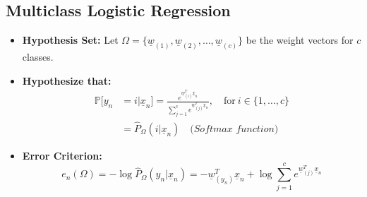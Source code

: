 \subsection{Multiclass Logistic Regression}
\begin{definition}
    \begin{itemize}
        \item \textbf{Hypothesis Set:} Let \( \Omega = \{ \underline{w}_{(1)}, \underline{w}_{(2)}, \dots, \underline{w}_{(c)} \} \) be the weight vectors for \( c \) classes.
        

        \item \textbf{Hypothesize that:}
        \begin{align*}
            \mathbb{P}[y_n &= i | \underline{x}_n] = \frac{e^{\underline{w}_{(i)}^T \underline{x}_n}}{\sum_{j=1}^{c} e^{\underline{w}_{(j)}^T \underline{x}_n}}, \quad \text{for} \ i \in \{1, \dots, c\} \\    
            &= \hat{P}_{\Omega}(i | \underline{x}_n) \quad \textit{(Softmax function)} 
        \end{align*}
        

        \item \textbf{Error Criterion:}
        \[
        e_n(\Omega) = -\log \hat{P}_{\Omega}(y_n | \underline{x}_n) = -\underline{w}_{(y_n)}^T \underline{x}_n + \log \sum_{j=1}^{c} e^{\underline{w}_{(j)}^T \underline{x}_n}
        \]
        
    \end{itemize}
\end{definition}

\begin{example}
\end{example}

